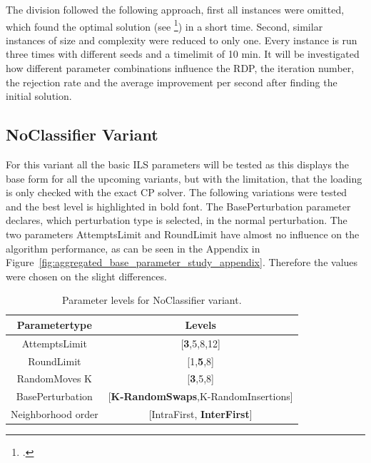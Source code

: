 The division followed the following approach, first all instances were omitted, which found
the optimal solution (see \cite{tamke_branch-and-cut_2024}\footcite[cf.][p.26]{tamke_branch-and-cut_2024})
in a short time. Second, similar instances of size and complexity were reduced to only one.
Every instance is run three times with different seeds and a timelimit of 10 min. It will be investigated
how different parameter combinations influence the RDP, the iteration number, the rejection rate and
the average improvement per second after finding the initial solution.

\subsection{NoClassifier Variant}
\label{subsec_parameterStuy_noclassifier}
For this variant all the basic \gls{ILS} parameters will be tested as this displays the base form
for all the upcoming variants, but with the limitation, that the loading is only checked
with the exact \gls{CP} solver. The following variations were tested and the best level is highlighted
in bold font. The BasePerturbation parameter declares, which perturbation type is selected, in the normal
perturbation. The two parameters AttemptsLimit and RoundLimit have almost no influence on the algorithm performance, as
can be seen in the Appendix in Figure~\ref{fig:aggregated_base_parameter_study_appendix}. Therefore the values were chosen
on the slight differences.

\begin{table}[ht]
    \centering
    \setlength{\tabcolsep}{2em}
    \def\arraystretch{1.1}
    \begin{tabular}{c c}
        \toprule
        Parametertype      & Levels                                      \\
        \midrule
        AttemptsLimit      & [\textbf{3},5,8,12]                         \\
        RoundLimit         & [1,\textbf{5},8]                            \\
        RandomMoves K      & [\textbf{3},5,8]                            \\
        BasePerturbation   & [\textbf{K-RandomSwaps},K-RandomInsertions] \\
        Neighborhood order & [IntraFirst, \textbf{InterFirst}]           \\
        \bottomrule
    \end{tabular}
    \caption{Parameter levels for NoClassifier variant.}
    \label{tab:parameters_noclassifier}
\end{table}

